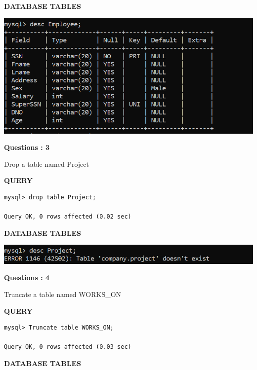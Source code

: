 \documentclass[a4paper,12pt]{report}
\begin{document}
\begin{flushleft}
		\textbf{DATABASE TABLES}
\end{flushleft} 

\includegraphics[scale=1]{alteradd.png}
\begin{flushleft}
    \textbf{Questions : 3}
\end{flushleft}
Drop a table named Project
\begin{flushleft}
		\textbf{QUERY }
	\end{flushleft}
\begin{verbatim}
mysql> drop table Project;

Query OK, 0 rows affected (0.02 sec)

\end{verbatim}

\begin{flushleft}
		\textbf{DATABASE TABLES}
\end{flushleft} 

\includegraphics[scale=1]{drop.png}
	\newpage
\begin{flushleft}
    \textbf{Questions : 4}
\end{flushleft}
Truncate a table named WORKS\_ON
\begin{flushleft}
		\textbf{QUERY }
	\end{flushleft}
\begin{verbatim}
mysql> Truncate table WORKS_ON;

Query OK, 0 rows affected (0.03 sec)

\end{verbatim}

\begin{flushleft}
		\textbf{DATABASE TABLES}
\end{flushleft} 
\end{document}

